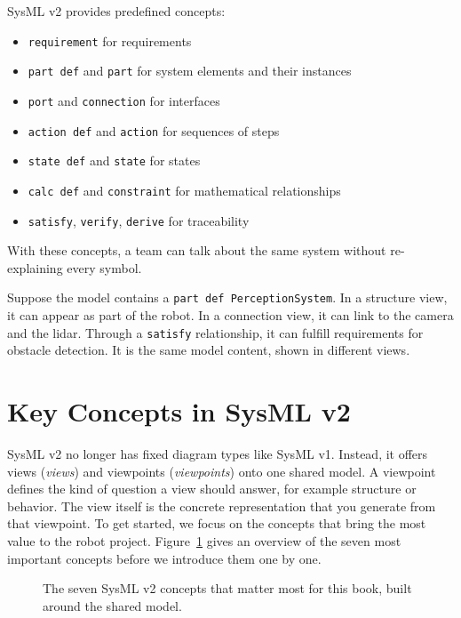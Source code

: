 SysML v2 provides predefined concepts:

\begin{itemize}
    \item \texttt{requirement} for requirements
    \item \texttt{part def} and \texttt{part} for system elements and their instances
    \item \texttt{port} and \texttt{connection} for interfaces
    \item \texttt{action def} and \texttt{action} for sequences of steps
    \item \texttt{state def} and \texttt{state} for states
    \item \texttt{calc def} and \texttt{constraint} for mathematical relationships
    \item \texttt{satisfy}, \texttt{verify}, \texttt{derive} for traceability
\end{itemize}

With these concepts, a team can talk about the same system without re-explaining every symbol.

\begin{praxisbox}
Suppose the model contains a \texttt{part def PerceptionSystem}. In a structure view, it can appear as part of the robot. In a connection view, it can link to the camera and the lidar. Through a \texttt{satisfy} relationship, it can fulfill requirements for obstacle detection. It is the same model content, shown in different views.
\end{praxisbox}

\section{Key Concepts in SysML v2}
SysML v2 no longer has fixed diagram types like SysML v1. Instead, it offers views (\emph{views}) and viewpoints (\emph{viewpoints}) onto one shared model. A viewpoint defines the kind of question a view should answer, for example structure or behavior. The view itself is the concrete representation that you generate from that viewpoint. To get started, we focus on the concepts that bring the most value to the robot project. Figure~\ref{fig:kap03-sysml-kernkonzepte} gives an overview of the seven most important concepts before we introduce them one by one.

\begin{figure}[H]
  \centering
  \caption{The seven SysML v2 concepts that matter most for this book, built around the shared model.}
  \label{fig:kap03-sysml-kernkonzepte}
\end{figure}

